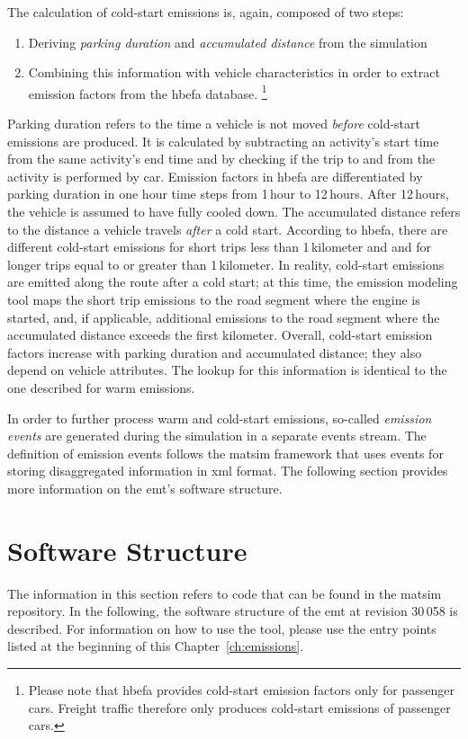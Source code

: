 The calculation of cold-start emissions is, again, composed of two steps:
%
\begin{enumerate}\styleEnumerate
 \item Deriving \emph{parking duration} and \emph{accumulated distance} 
 from the simulation
 \item Combining this information with vehicle characteristics in order to 
 extract emission factors from the \gls{hbefa} database.%
 \footnote{
 Please note that \gls{hbefa} provides cold-start emission factors only for 
 passenger cars. Freight traffic therefore only produces cold-start emissions 
 of passenger cars.
 }
\end{enumerate}
%
Parking duration refers to the time a vehicle is not moved \emph{before} 
cold-start emissions are produced. It is calculated by subtracting an 
activity's start time from the same activity's end time and by checking if the 
trip to and from the activity is performed by car. Emission factors in 
\gls{hbefa} 
are differentiated by parking duration in one hour time steps from 1\,hour to 
12\,hours. After 12\,hours, the vehicle is assumed to have fully cooled down.
%
The accumulated distance refers to the distance a vehicle travels \emph{after} 
a cold start. According to \gls{hbefa}, there are different cold-start 
emissions for short trips less than 1\,kilometer and and for longer trips equal to or greater than 1\,kilometer.
%
In reality, cold-start emissions are emitted along the route after a cold start;
at this time, the emission modeling tool maps the short trip emissions to the road
segment where the engine is started, and, if applicable, additional emissions
to the road segment where the accumulated distance exceeds the first kilometer.
%
Overall, cold-start emission factors increase with parking duration and 
accumulated distance; they also depend on vehicle attributes. The 
lookup for this information is identical to the one described for warm 
emissions.

In order to further process warm and cold-start emissions, so-called 
\emph{emission events} are generated during the simulation in a separate 
events stream. The definition of emission events follows the \gls{matsim} 
framework that uses events for storing disaggregated information in 
\gls{xml} format. The following section provides more information 
on the \gls{emt}'s software structure.

\section{Software Structure}
\label{ch:emissions:structure}
The information in this section refers to code that can be found in the 
\gls{matsim} repository. In the following, the software structure of the \gls{emt} at 
revision 30\,058 is described. For information on how to use the tool, please use the entry points listed at the beginning of this Chapter~\ref{ch:emissions}.
%


